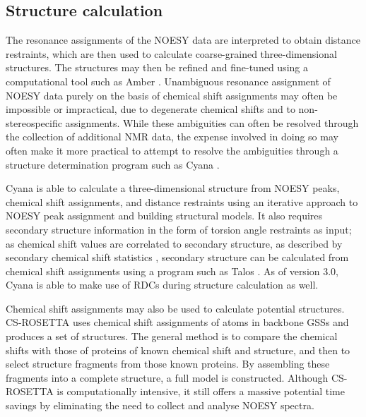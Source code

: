 \subsection*{Structure calculation}
The resonance assignments of the NOESY data are 
interpreted to obtain distance restraints, which are then used to calculate 
coarse-grained three-dimensional structures.  The structures may then be 
refined and fine-tuned using a computational tool such as Amber \cite{amber}.  
Unambiguous resonance assignment of NOESY data purely on the basis of chemical 
shift assignments may often be impossible or impractical, due to degenerate 
chemical shifts and to non-stereospecific assignments.  While these 
ambiguities can often be resolved through the collection of additional 
NMR data, the expense involved in doing so may often make it more practical 
to attempt to resolve the ambiguities through a structure determination 
program such as Cyana \cite{cyana2004}.

Cyana is able to calculate a three-dimensional structure from NOESY peaks, 
chemical shift assignments, and distance restraints \cite{cyana2004, aria2003} 
using an iterative approach to NOESY peak assignment and building structural 
models.  It also requires secondary structure information in the form of 
torsion angle restraints as input; as
chemical shift values are correlated to secondary structure, as described
by secondary chemical shift statistics \cite{spera1991empirical}, secondary 
structure can be calculated from chemical shift assignments using a program 
such as Talos \cite{talos+}.  As of version 3.0, Cyana is able to make use
of RDCs during structure calculation as well.

Chemical shift assignments may also be used to calculate potential structures.
CS-ROSETTA \cite{cs-rosetta} uses chemical shift assignments of atoms in 
backbone GSSs and produces a set of structures.  The general method is to 
compare the chemical shifts with those of proteins of known chemical shift
and structure, and then to select structure fragments from those known 
proteins.  By assembling these fragments into a complete structure, a full
model is constructed.  Although CS-ROSETTA is computationally intensive, it
still offers a massive potential time savings by eliminating the need to
collect and analyse NOESY spectra.

